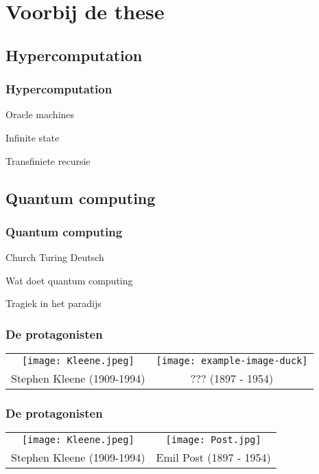 \documentclass{beamer}
\begin{document}
\section{Voorbij de these}
\subsection{Hypercomputation}
\begin{frame}
    \frametitle{Hypercomputation}

    Oracle machines

    Infinite state

    Transfiniete recursie
\end{frame}
\subsection{Quantum computing}
\begin{frame}
    \frametitle{Quantum computing}

    Church Turing Deutsch

    Wat doet quantum computing
\end{frame}

\begin{frame}
    \begin{center}
        {\LARGE Tragiek in het paradijs}
    \end{center}
\end{frame}


\begin{frame}
    \frametitle{De protagonisten}
    \begin{tabular*}{\textwidth}{c c}
        \texttt{[image: Kleene.jpeg]} & \texttt{[image: example-image-duck]} \\
        {\large Stephen Kleene} (1909-1994) & {\large ???} (1897 - 1954)\\
    \end{tabular*}
\end{frame}

\begin{frame}
    \frametitle{De protagonisten}
    \begin{tabular*}{\textwidth}{c c}
        \texttt{[image: Kleene.jpeg]} & \texttt{[image: Post.jpg]} \\
        {\large Stephen Kleene} (1909-1994) & {\large Emil Post} (1897 - 1954)\\
    \end{tabular*}
\end{frame}
\end{document}
